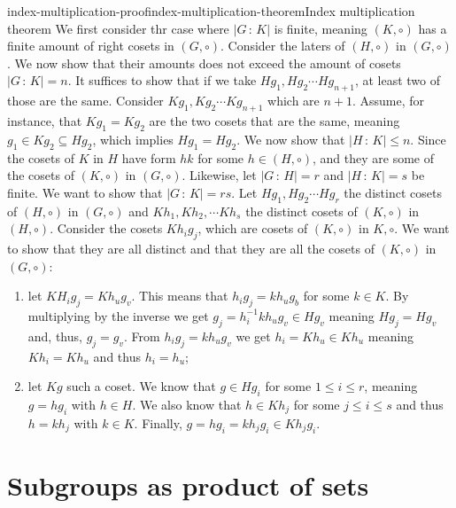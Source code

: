 \documentclass[preview]{standalone}
\begin{document}
\begin{snippetproof}{index-multiplication-proof}{index-multiplication-theorem}{Index multiplication theorem}
    We first consider thr case where \(|G\,:\,K|\)
    is finite, meaning \((K, \circ)\) has a finite amount of right cosets in \((G, \circ)\).
    Consider the laters of \((H, \circ)\) in \((G, \circ)\). We now show that their amounts
    does not exceed the amount of cosets \(|G\,:\,K|=n\). It suffices to show that
    if we take \(Hg_1, Hg_2 \cdots Hg_{n+1}\), at least two of those
    are the same. Consider \(Kg_1, Kg_2 \cdots Kg_{n+1}\) which are \(n+1\).
    Assume, for instance, that \(Kg_1 = Kg_2\) are the two cosets that are the same,
    meaning \(g_1 \in Kg_2 \subseteq Hg_2\), which implies \(Hg_1 = Hg_2\).
    We now show that \(|H\,:\,K| \leq n\). Since the cosets
    of \(K\) in \(H\) have form \(hk\) for some \(h\in (H, \circ)\), and they are
    some of the cosets of \((K, \circ)\) in \((G, \circ)\).
    Likewise, let \(|G\,:\,H| = r\) and \(|H\,:\,K| = s\) be finite.
    We want to show that \(|G\,:\,K| = rs\).
    Let \(Hg_1, Hg_2 \cdots Hg_r\) the distinct cosets of \((H, \circ)\) in \((G, \circ)\)
    and \(Kh_1,Kh_2,\cdots Kh_s\) the distinct cosets of \((K, \circ)\) in \((H, \circ)\).
    Consider the cosets \(Kh_ig_j\), which are cosets of \((K, \circ)\) in \(K, \circ\).
    We want to show that they are all distinct and that they are all the cosets of \((K, \circ)\)
    in \((G, \circ)\):
    \begin{enumerate}
        \item let \(KH_ig_j = Kh_ug_v\).
        This means that \(h_ig_j = kh_ug_b\) for some \(k\in K\).
        By multiplying by the inverse we get
        \(g_j = h_i^{-1}kh_ug_v \in Hg_v\) meaning \(Hg_j = Hg_v\) and, thus,
        \(g_j = g_v\). From \(h_ig_j = kh_ug_v\) we get
        \(h_i = Kh_u \in Kh_u\) meaning \(Kh_i = Kh_u\) and thus \(h_i = h_u\);
        \item let \(Kg\) such a coset. We know that \(g \in Hg_i\)
        for some \(1\leq i \leq r\), meaning \(g=hg_i\) with \(h\in H\).
        We also know that \(h \in Kh_j\) for some \(j \leq i \leq s\)
        and thus \(h=kh_j\) with \(k\in K\).
        Finally, \(g = hg_i = kh_j g_i \in Kh_j g_i\).
    \end{enumerate}
\end{snippetproof}

\section{Subgroups as product of sets}
\end{document}
